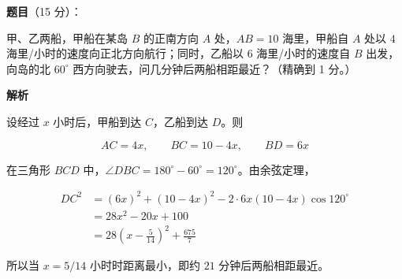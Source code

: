 \begin{answer}

\textbf{题目}（15 分）：

甲、乙两船，甲船在某岛 $B$ 的正南方向 $A$ 处，$AB=10$ 海里，甲船自 $A$ 处以 $4$ 海里/小时的速度向正北方向航行；同时，乙船以 $6$ 海里/小时的速度自 $B$ 出发，向岛的北 $60^\circ$ 西方向驶去，问几分钟后两船相距最近？（精确到 1 分。）
\nopagebreak[4]
\begin{center}\end{center}
\nopagebreak[4]
\textbf{解析}

设经过 $x$ 小时后，甲船到达 $C$，乙船到达 $D$。则

\nopagebreak[4]
\[
AC=4x,\qquad BC=10-4x,\qquad BD=6x
\]

在三角形 $BCD$ 中，$\angle DBC=180^\circ-60^\circ=120^\circ$。由余弦定理，

\nopagebreak[4]
\[
\begin{aligned}
DC^2&=(6x)^2+(10-4x)^2-2\cdot6x(10-4x)\cos120^\circ\\
&=28x^2-20x+100\\
&=28\left(x-\frac5{14}\right)^2+\frac{675}{7}
\end{aligned}
\]

所以当 $x=5/14$ 小时时距离最小，即约 $21$ 分钟后两船相距最近。


\end{answer}
